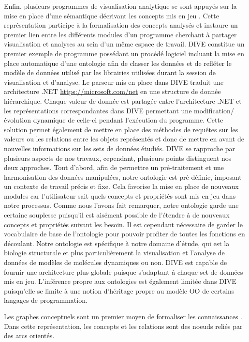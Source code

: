 Enfin, plusieurs programmes de visualisation analytique se sont appuyés sur la mise en place d'une sémantique décrivant les concepts mis en jeu \cite{rysavy_dive:_2014}. Cette représentation participe à la formalisation des concepts analysés et instaure un premier lien entre les différents modules d'un programme cherchant à partager visualisation et analyses au sein d'un même espace de travail. DIVE constitue un premier exemple de programme possédant un procédé logiciel incluant la mise en place automatique d'une ontologie afin de classer les données et de refléter le modèle de données utilisé par les librairies utilisées durant la session de visualisation et d'analyse. Le parseur mis en place dans DIVE traduit une architecture .NET \url{https://microsoft.com/net} en une structure de donnée hiérarchique. Chaque valeur de donnée est partagée entre l'architecture .NET et les représentations correspondantes dans DIVE permettant une modification/évolution dynamique de celle-ci pendant l’exécution du programme. Cette solution permet également de mettre en place des méthodes de requêtes sur les valeurs ou les relations entre les objets représentés et donc de mettre en avant de nouvelles informations sur les sets de données étudiés. DIVE se rapproche par plusieurs aspects de nos travaux, cependant, plusieurs points distinguent nos deux approches. Tout d'abord, afin de permettre un pré-traitement et une harmonisation des données manipulées, notre ontologie est pré-définie, imposant un contexte de travail précis et fixe. Cela favorise la mise en place de nouveaux modules car l'utilisateur sait quels concepts et propriétés sont mis en jeu dans notre processus. Comme nous l'avons fait remarquer, notre ontologie garde une certaine souplesse puisqu'il est aisément possible de l'étendre à de nouveaux concepts et propriétés suivant les besoin. Il est cependant nécessaire de garder le vocabulaire de base de l'ontologie pour pouvoir profiter de toutes les fonctions en découlant. Notre ontologie est spécifique à notre domaine d'étude, qui est la biologie structurale et plus particulièrement la visualisation et l'analyse de données de modèles de molécules dynamiques ou non. DIVE est capable de fournir une architecture plus globale puisque s'adaptant à chaque set de données mis en jeu. L'inférence propre aux ontologies est également limitée dans DIVE puisqu'elle se limite à une notion d'héritage propre au modèle OO de certains langages de programmation.

Les graphes conceptuels sont un premier moyen de formaliser les connaissances \cite{chein2008graph}. Dans cette représentation, les concepts et les relations sont des noeuds reliés par des arcs orientés.

